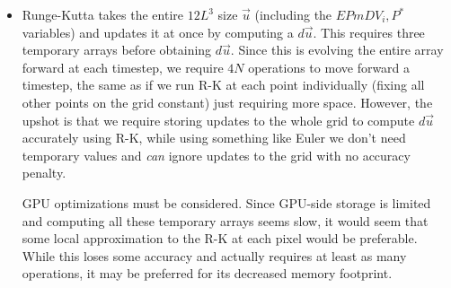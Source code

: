 \documentclass[10pt]{article}
\begin{document}
\begin{itemize}
    \item Runge-Kutta takes the entire $12L^3$ size $\vec{u}$ (including the $EPmDV_i, P^*$ variables) and updates it at once by computing a $d\vec{u}$. This requires three temporary arrays before obtaining $d\vec{u}$. Since this is evolving the entire array forward at each timestep, we require $4N$ operations to move forward a timestep, the same as if we run R-K at each point individually (fixing all other points on the grid constant) just requiring more space. However, the upshot is that we require storing updates to the whole grid to compute $d\vec{u}$ accurately using R-K, while using something like Euler we don't need temporary values and \emph{can} ignore updates to the grid with no accuracy penalty.

        GPU optimizations must be considered. Since GPU-side storage is limited and computing all these temporary arrays seems slow, it would seem that some local approximation to the R-K at each pixel would be preferable. While this loses some accuracy and actually requires at least as many operations, it may be preferred for its decreased memory footprint.
\end{itemize}
\end{document}
